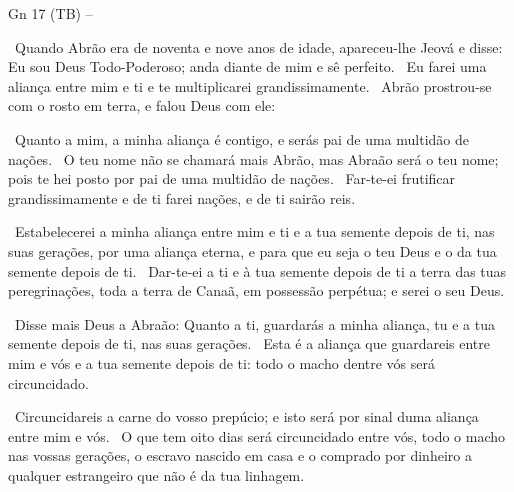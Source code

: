 \documentclass[12pt,aspectratio=169]{beamer}
\newcommand{\ver}[1]{%
    \raisebox{0.50ex}{%
        \scalebox{1.1}{%
            \pmb{\textbf{\textcolor{BSpbg}{#1}}}%
        }%
    }%
}
\newcommand{\QUOTE}[1]{%
    \par\noindent\hspace*{0.05\linewidth}%
    \begin{minipage}{0.9\linewidth}%
        \linespread{1.35}\large{#1}%
    \end{minipage}%
}
\newcommand{\ORA}[1]{{\textcolor{TXred!50!TXyel}{#1}}}
\newcommand{\YEL}[1]{{\textcolor{TXyel}{#1}}}
\newcommand{\GRE}[1]{{\textcolor{TXgre}{#1}}}
\newcommand{\CYA}[1]{{\textcolor{TXcya}{#1}}}
\newcommand{\BLU}[1]{{\textcolor{TXblu}{#1}}}
\newcommand{\MAG}[1]{{\textcolor{TXmag}{#1}}}
\newcommand{\BRI}[1]{{\textcolor{BSpbg}{#1}}}   %
\begin{document}
    \begin{frame}[allowframebreaks]{\BRI{Gn 17} (TB) --}
        \QUOTE{%
            \ver{1}~Quando Abrão era de \YEL{noventa e nove anos} de idade, apareceu-lhe Jeová e
            disse: \CYA{Eu sou Deus Todo-Poderoso}; \MAG{anda diante de mim e sê perfeito}.
            \ver{2}~\BLU{Eu farei} uma \YEL{aliança} entre mim e ti e te \YEL{multiplicarei
            grandissimamente}.
            \ver{3}~Abrão prostrou-se com o rosto em terra, e falou Deus com ele:
        }

        \pagebreak

        \QUOTE{%
            \ver{4}~Quanto a mim, a minha aliança é contigo, e serás \YEL{pai de uma multidão de
            nações}.
            \ver{5}~O teu nome não se chamará mais Abrão, mas \YEL{Abraão será o teu nome}; pois
            te hei posto por \YEL{pai de uma multidão de nações}.
            \ver{6}~Far-te-ei frutificar grandissimamente e de ti farei \YEL{nações}, e de ti
            sairão \MAG{reis}.
        }

        \pagebreak

        \QUOTE{%
            \ver{7}~\YEL{Estabelecerei} a minha aliança \GRE{entre mim e ti e a tua semente
            depois de ti}, nas suas gerações, por uma \CYA{aliança eterna}, e para que \BLU{eu
            seja o teu Deus e o da tua semente depois de ti}.
            \ver{8}~Dar-te-ei a \YEL{ti} e à tua \YEL{semente} depois de ti a \YEL{terra} das
            tuas peregrinações, toda a \YEL{terra} de Canaã, em \GRE{possessão} \YEL{perpétua};
            e \BLU{serei o seu Deus}.
        }

        \pagebreak

        \QUOTE{%
            \ver{9}~Disse mais Deus a Abraão: Quanto a ti, \MAG{guardarás a minha aliança, tu e
            a tua semente} depois de ti, nas suas gerações.
            \ver{10}~\YEL{Esta é} a aliança que \YEL{guardareis} entre mim e vós e a tua semente
            depois de ti: \MAG{todo o macho dentre vós será circuncidado}.
        }

        \pagebreak

        \QUOTE{%
            \ver{11}~\MAG{Circuncidareis} a carne do vosso prepúcio; e isto será por \YEL{sinal
            duma aliança} entre mim e vós.
            \ver{12}~O que tem \GRE{oito dias} será circuncidado entre vós, todo o macho nas
            vossas gerações, o \YEL{escravo nascido} em casa \ORA{e o comprado} por dinheiro a
            qualquer \ORA{estrangeiro que não é da tua linhagem}.
        }


\end{frame}
\end{document}
